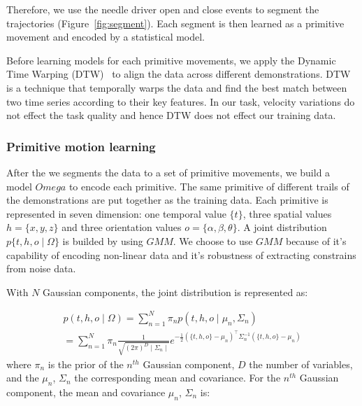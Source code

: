 Therefore, we use the needle driver open and close events to segment the trajectories (Figure~\ref{fig:segment}). Each segment is then learned as a primitive movement and encoded by a statistical model.

Before learning models for each primitive movements, we apply the Dynamic Time Warping (DTW)~\cite{berndt1994using} to align the data across different demonstrations. DTW is a technique that temporally warps the data and find the best match between two time series according to their key features. In our task, velocity variations do not effect the task quality and hence DTW does not effect our training data.


\subsubsection{Primitive motion learning}

After the we segments the data to a set of primitive movements, we build a model $Omega$ to encode each primitive. The same primitive of different trails of the demonstrations are put together as the training data. Each primitive is represented in seven dimension: one temporal value $\{t\}$, three spatial values $h=\{x, y, z\}$ and three orientation values $o=\{\alpha, \beta, \theta\}$. A joint distribution $p\{t,h,o\mid\Omega\}$ is builded by using $GMM$. We choose to use $GMM$ because of it's capability of encoding non-linear data and it's robustness of extracting constrains from noise data.

With $N$ Gaussian components, the joint distribution is represented as:

\begin{equation}
\begin{split}
p\left(t,h,o\mid\Omega\right) = \sum_{n=1}^N \pi_n p\left(t,h,o\mid\mu_n,\Sigma_n\right) \\
= \sum_{n=1}^N \pi_n \frac{1}{\sqrt{\left(2\pi\right)^D \mid\Sigma_n\mid }} e^{-\frac{1}{2}\left(\{t,h,o\}-\mu_n\right)^{\top} \Sigma^{-1}_n \left(\{t,h,o\}-\mu_n\right)}
\end{split}
\end{equation}
where $\pi_n$ is the prior of the $n^{th}$ Gaussian component, $D$ the number of variables,
and the ${\mu}_n$, ${\Sigma}_n$ the corresponding mean and covariance. For the $n^{th}$ Gaussian component, the mean and covariance $\mu_n$, $\Sigma_n$ is:

